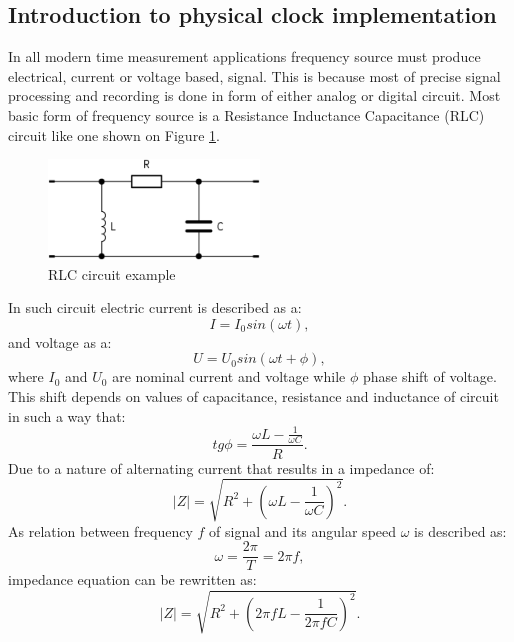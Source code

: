 \subsection{Introduction to physical clock implementation}
In all modern time measurement applications frequency source must produce electrical, current or
voltage based, signal. This is because most of precise signal processing and recording is done
in form of either analog or digital circuit.
Most basic form of frequency source is a Resistance Inductance Capacitance (RLC) circuit like 
one shown on Figure \ref{fig:rlc_circ}.
\begin{figure}[htb] 
	\label{fig:rlc_circ}
	\centering
	\includegraphics[width=0.5\textwidth]{figures/rlc}
	\caption{RLC circuit example}
\end{figure}
In such circuit electric current is described as a:
\begin{equation}
	\label{equ:rlc_current}
	I = I_{0}sin(\omega t),
\end{equation}
and voltage as a:
\begin{equation}
	\label{equ:rlc_voltage}
	U = U_{0}sin(\omega t + \phi),
\end{equation}
where $I_{0}$ and $U_{0}$ are nominal current and voltage while $\phi$ phase shift of voltage.
This shift depends on values of capacitance, resistance and inductance of circuit in such a way
that:
\begin{equation}
	\label{equ:rlc_freq}
	tg\phi = \frac{\omega L - \frac{1}{\omega C} }{R}.
\end{equation}
Due to a nature of alternating current that results in a impedance of:
\begin{equation}
	\label{equ:rlc_impedance}
	|Z| = \sqrt{R^{2}+ (\omega L - \frac{1}{\omega C})^{2} }.
\end{equation}
As relation between frequency $f$ of signal and its angular speed $\omega$ is described as:
\begin{equation}
	\label{equ:pulse_to_freq}
	\omega = \frac{2\pi}{T} = 2\pi f,
\end{equation}
impedance equation can be rewritten as:
\begin{equation}
	\label{equ:rlc_impedance}
	|Z| = \sqrt{R^{2}+ (2\pi fL - \frac{1}{2\pi f C})^{2} }.
\end{equation}
